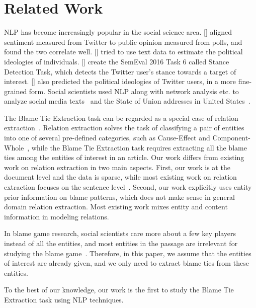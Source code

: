 \documentclass[letterpaper]{article} %
\begin{document}
\section{Related Work}
\label{task}

NLP has become increasingly popular in the social science area. \citeauthor{o2010tweets} [\citeyear{o2010tweets}] aligned sentiment measured from Twitter to public opinion measured from polls, and found the two correlate well. \citeauthor{bamman2015open} [\citeyear{bamman2015open}] tried to use text data to estimate the political ideologies of individuals. \citeauthor{mohammad-EtAl:2016:SemEval} [\citeyear{mohammad-EtAl:2016:SemEval}] create the SemEval 2016 Task 6 called Stance Detection Task, which detects the Twitter user's stance towards a target of interest. \citeauthor{preoctiuc2017beyond} [\citeyear{preoctiuc2017beyond}] also predicted the political ideologies of Twitter users, in a more fine-grained form. Social scientists used NLP along with network analysis etc. to analyze social media texts~\cite{rule2015lexical} and the State of Union addresses in United States~\cite{bail2016combining}.

The Blame Tie Extraction task can be regarded as a special case of relation extraction~\cite{miwa2016end}. Relation extraction solves the task of classifying a pair of entities into one of several pre-defined categories, such as Cause-Effect and Component-Whole~\cite{hendrickx2009semeval}, while the Blame Tie Extraction task requires extracting all the blame ties among the entities of interest in an article. Our work differs from existing work on relation extraction in two main aspects. First, our work is at the document level and the data is sparse, while most existing work on relation extraction focuses on the sentence level~\cite{nguyen2015relation}. Second, our work explicitly uses entity prior information on blame patterns, which does not make sense in general domain relation extraction. Most existing work mixes entity and content information in modeling relations.

In blame game research, social scientists care more about a few key players instead of all the entities, and most entities in the passage are irrelevant for studying the blame game~\cite{nicolno}. Therefore, in this paper, we assume that the entities of interest are already given, and we only need to extract blame ties from these entities.

To the best of our knowledge, our work is the first to study the Blame Tie Extraction task using NLP techniques.
\end{document}

